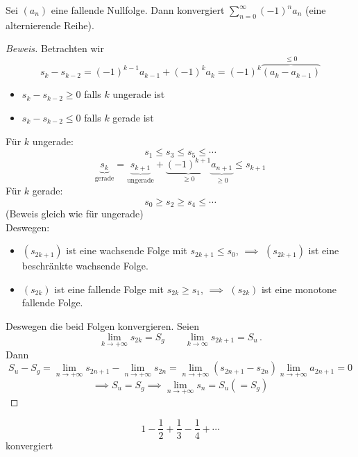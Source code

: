 \begin{Sat} Sei $(a_n)$ eine fallende Nullfolge. Dann konvergiert $\sum^\infty_{n=0}(-1)^na_n$ (eine alternierende Reihe).
\end{Sat}
\begin{proof}[Beweis]
  Betrachten wir 
  \[s_k-s_{k-2}=(-1)^{k-1}a_{k-1}+(-1)^ka_k = (-1)^k\overbrace{(a_k-a_{k-1})}^{\leq 0}\]
  \begin{itemize}
    \item $s_k-s_{k-2}\geq 0$ falls $k$ ungerade ist
    \item $s_k-s_{k-2}\leq 0$ falls $k$ gerade ist
  \end{itemize}
  Für $k$ ungerade:
  \[s_1\leq s_3\leq s_5\leq \cdots\]
  \[\underbrace{s_k}_{\text{gerade}}=\underbrace{s_{k+1}}_{\text{ungerade}}+
\underbrace{(-1)^{k+1}}_{\geq 0}
\underbrace{a_{n+1}}_{\geq 0}\leq s_{k+1}\]
  Für $k$ gerade:
  \[s_0\geq s_2\geq s_4\leq \cdots\]
(Beweis gleich wie für ungerade)\\
Deswegen: 
\begin{itemize}
\item $(s_{2k+1})$ ist eine wachsende Folge mit $s_{2k+1}\leq s_0$,
$\implies$ $(s_{2k+1})$ ist eine beschr\"ankte wachsende Folge.
\item $(s_{2k})$ ist eine fallende Folge mit $s_{2k}\geq s_1$,
$\implies$ $(s_{2k})$ ist eine monotone fallende Folge.
\end{itemize}
Deswegen die beid Folgen konvergieren.
Seien
\[\lim_{k\to+\infty} s_{2k}=S_g\qquad
 \lim_{k\to\infty} s_{2k+1} = S_u\, .
\]
Dann
\[S_u-S_g=\lim_{n\to+\infty}s_{2n+1}-\lim_{n\to+\infty}s_{2n}=
\lim_{n\to+\infty}(s_{2n+1}-s_{2n})\lim_{n\to+\infty}a_{2n+1}=0\]
\[\implies S_u=S_g\implies \lim_{n\to+\infty}s_n=S_u(=S_g)\]
\end{proof}
\begin{Kor}
  \[1-\frac{1}{2}+\frac{1}{3}-\frac{1}{4}+\cdots\]
  konvergiert
\end{Kor}
